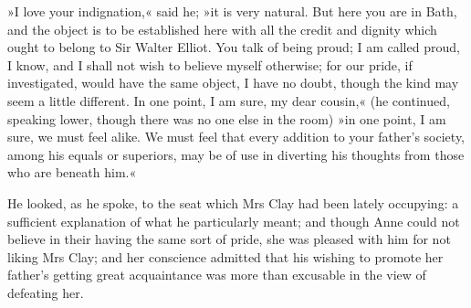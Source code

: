 »I love your indignation,« said he; »it is very natural. But here you are in Bath, and the object is to be established here with all the credit and dignity which ought to belong to Sir Walter Elliot. You talk of being proud; I am called proud, I know, and I shall not wish to believe myself otherwise; for our pride, if investigated, would have the same object, I have no doubt, though the kind may seem a little different. In one point, I am sure, my dear cousin,« (he continued, speaking lower, though there was no one else in the room) »in one point, I am sure, we must feel alike. We must feel that every addition to your father's society, among his equals or superiors, may be of use in diverting his thoughts from those who are beneath him.«

He looked, as he spoke, to the seat which Mrs Clay had been lately occupying: a sufficient explanation of what he particularly meant; and though Anne could not believe in their having the same sort of pride, she was pleased with him for not liking Mrs Clay; and her conscience admitted that his wishing to promote her father's getting great acquaintance was more than excusable in the view of defeating her.
